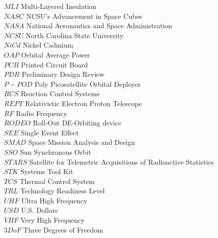 \begin{tabbing}
  $MLI$ \> Multi-Layered Insulation \\
  $NASC$ \> NCSU's Advancement in Space Cubes \\
  $NASA$ \> National Aeronautics and Space Administration \\
  $NCSU$ \> North Carolina State University \\
  $NiCd$ \> Nickel Cadmium \\
  $OAP$ \> Orbital Average Power \\
  $PCB$ \> Printed Circuit Board \\
  $PDR$ \> Preliminary Design Review \\
  $P-POD$ \> Poly Picosatellite Orbital Deployer \\
  $RCS$ \> Reaction Control Systems \\
  $REPT$ \> Relativistic Electron Proton Telescope \\
  $RF$ \> Radio Frequency \\
  $RODEO$ \> Roll-Out DE-Orbiting device \\
  $SEE$ \> Single Event Effect \\
  $SMAD$ \> Space Mission Analysis and Design \\
  $SSO$ \> Sun Synchronous Orbit \\
  $STARS$ \> Satellite for Telemetric Acquisitions of Radioactive Statistics \\
  $STK$ \> Systems Tool Kit \\
  $TCS$ \> Thermal Control System \\
  $TRL$ \> Technology Readiness Level \\
  $UHF$ \> Ultra High Frequency \\
  $USD$ \> U.S. Dollars \\
  $VHF$ \> Very High Frequency \\
  $3DoF$ \> Three Degrees of Freedom \\
  [5pt]
 \end{tabbing}
 
 \vspace{0.5mm}
\pagebreak